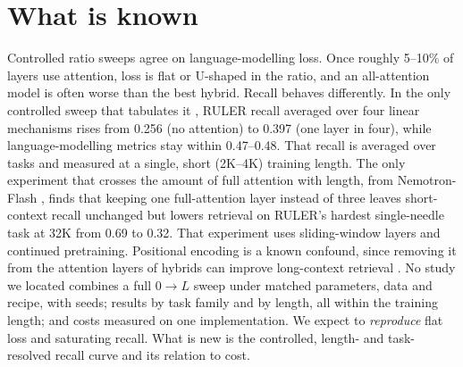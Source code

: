 \documentclass[10pt,a4paper]{article}
\begin{document}
\section{What is known}
Controlled ratio sweeps
\citep{waleffe2024empirical,dao2024transformers,bae2025hybrid,wang2025systematic,kimi2025linear} agree
on language-modelling loss. Once roughly 5--10\% of layers use attention, loss is flat or U-shaped in the
ratio, and an all-attention model is often worse than the best hybrid. Recall behaves differently. In the
only controlled sweep that tabulates it \citep{wang2025systematic}, RULER recall averaged over four linear
mechanisms rises from 0.256 (no attention) to 0.397 (one layer in four), while language-modelling metrics
stay within 0.47--0.48. That recall is averaged over tasks and measured at a single, short (2K--4K) training length. The only experiment that
crosses the amount of full attention with length, from Nemotron-Flash \citep{fu2025nemotronflash},
finds that keeping one full-attention layer instead of three leaves short-context recall unchanged but lowers retrieval on RULER's hardest single-needle task at 32K
from 0.69 to 0.32. That experiment uses sliding-window layers and continued pretraining.
Positional encoding is a known confound, since removing it from the attention layers of hybrids can
improve long-context retrieval \citep{qiao2026nope}. No study we located combines a full $0\to L$ sweep
under matched parameters, data and recipe, with seeds; results by task family and by length, all within
the training length; and costs measured on one implementation. We expect to \emph{reproduce} flat
loss and saturating recall. What is new is the controlled, length- and task-resolved recall curve and
its relation to cost.

\end{document}
